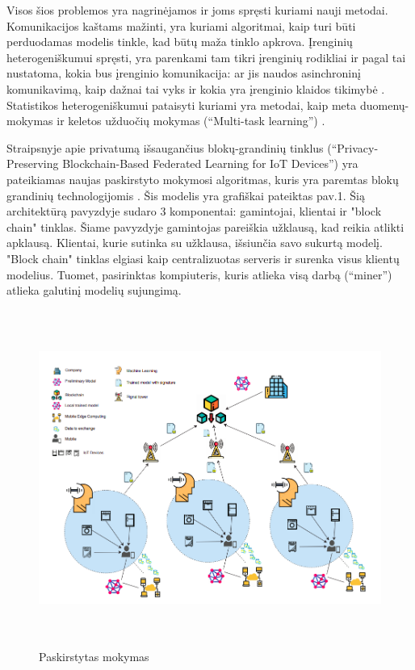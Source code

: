 \documentclass{VUMIFInfBakalaurinis}
\begin{document}
	\par Visos šios problemos yra nagrinėjamos ir joms spręsti kuriami nauji metodai. Komunikacijos kaštams mažinti, yra kuriami algoritmai, kaip turi būti perduodamas modelis tinkle, kad būtų maža tinklo apkrova. Įrenginių heterogeniškumui spręsti, yra parenkami tam tikri įrenginių rodikliai ir pagal tai nustatoma, kokia bus įrenginio komunikacija: ar jis naudos asinchroninį komunikavimą, kaip dažnai tai vyks ir kokia yra įrenginio klaidos tikimybė \cite{4}. Statistikos heterogeniškumui pataisyti kuriami yra metodai, kaip meta duomenų-mokymas ir keletos užduočių mokymas (\enquote{Multi-task learning}) \cite{4}. 
	\par Straipsnyje apie privatumą išsaugančius blokų-grandinių tinklus (\enquote{Privacy-Preserving Blockchain-Based Federated Learning for IoT Devices}) yra pateikiamas naujas paskirstyto mokymosi algoritmas, kuris yra paremtas
blokų grandinių technologijomis \cite{5}. Šis modelis yra grafiškai pateiktas pav.1. Šią architektūrą pavyzdyje sudaro 3 komponentai: gamintojai, klientai ir "block chain" tinklas. Šiame pavyzdyje gamintojas pareiškia užklausą, kad reikia atlikti apklausą. Klientai, kurie sutinka su užklausa, išsiunčia savo sukurtą modelį. "Block chain" tinklas elgiasi kaip centralizuotas serveris ir surenka visus klientų modelius. Tuomet, pasirinktas kompiuteris, kuris atlieka visą darbą (\enquote{miner}) atlieka galutinį modelių sujungimą.


\begin{figure}[ht]
  \centering
  \includegraphics[width=13cm,height=11cm,keepaspectratio]{img/paskirstytasMokymasis.png}
  \caption{Paskirstytas mokymas \cite{5}}
  \label{fig:overflowProblem}
\end{figure}
\end{document}
